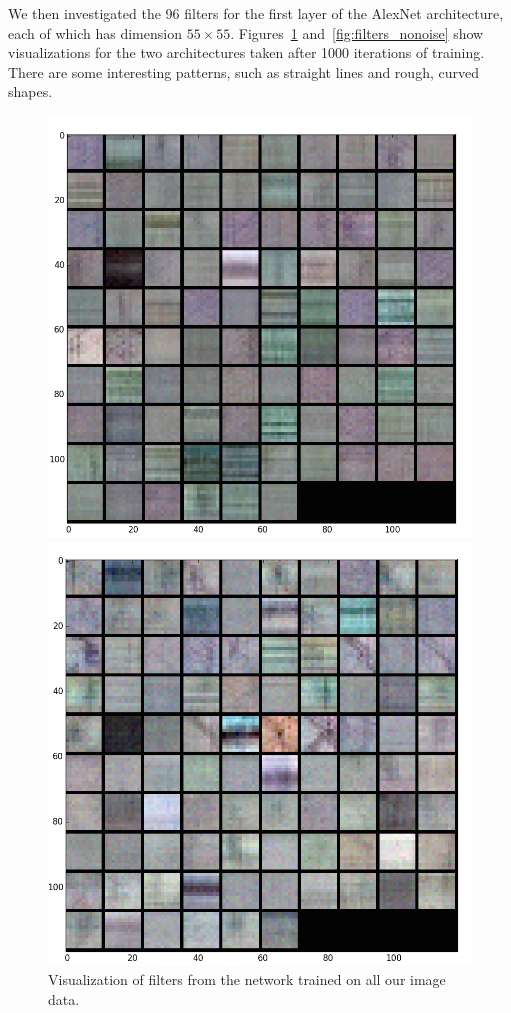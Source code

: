 \documentclass[10pt]{article}
\begin{document}
We then investigated the 96 filters for the first layer of the AlexNet architecture, each of which
has dimension $55\times 55$. Figures~\ref{fig:filters_all} and~\ref{fig:filters_nonoise} show
visualizations for the two architectures taken after 1000 iterations of training. There are some
interesting patterns, such as straight lines and rough, curved shapes.

\begin{figure}[t]
\centering
  \begin{minipage}{.35\textwidth}
  \centering
  \includegraphics[width=1\linewidth]{Filters_All1000}
  \caption{Visualization of filters from the network trained on all our image data.}
  \label{fig:filters_all}
  \end{minipage}\hfill
  \begin{minipage}{.35\textwidth}
  \centering
  \includegraphics[width=1\linewidth]{Filters_NoNoise1000}

\end{minipage}
\end{figure}
\end{document}
